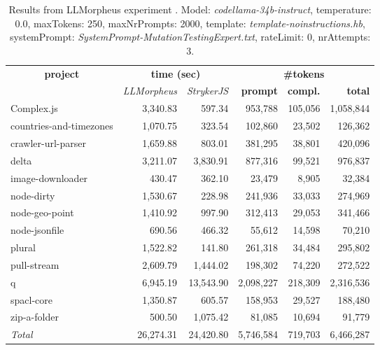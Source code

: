 
\begin{table*}[hbt!]
\centering
{\scriptsize
\begin{tabular}{l||r|r|r|r|r}
\multicolumn{1}{c|}{\bf project} & \multicolumn{2}{|c|}{\bf time (sec)} & \multicolumn{3}{|c|}{\bf \#tokens} \\
               & {\it LLMorpheus} & {\it StrykerJS} & {\bf prompt} & {\bf compl.} & {\bf total} \\
\hline
  Complex.js & 3,340.83 & 597.34 & 953,788 & 105,056 & 1,058,844 \\ 
countries-and-timezones & 1,070.75 & 323.54 & 102,860 & 23,502 & 126,362 \\ 
crawler-url-parser & 1,659.88 & 803.01 & 381,295 & 38,801 & 420,096 \\ 
delta & 3,211.07 & 3,830.91 & 877,316 & 99,521 & 976,837 \\ 
image-downloader & 430.47 & 362.10 & 23,479 & 8,905 & 32,384 \\ 
node-dirty & 1,530.67 & 228.98 & 241,936 & 33,033 & 274,969 \\ 
node-geo-point & 1,410.92 & 997.90 & 312,413 & 29,053 & 341,466 \\ 
node-jsonfile & 690.56 & 466.32 & 55,612 & 14,598 & 70,210 \\ 
plural & 1,522.82 & 141.80 & 261,318 & 34,484 & 295,802 \\ 
pull-stream & 2,609.79 & 1,444.02 & 198,302 & 74,220 & 272,522 \\ 
q & 6,945.19 & 13,543.90 & 2,098,227 & 218,309 & 2,316,536 \\ 
spacl-core & 1,350.87 & 605.57 & 158,953 & 29,527 & 188,480 \\ 
zip-a-folder & 500.50 & 1,075.42 & 81,085 & 10,694 & 91,779 \\ 
\hline
  \textit{Total} & 26,274.31 & 24,420.80 & 5,746,584 & 719,703 & 6,466,287 \\
  \end{tabular}
  }
  \\[2mm]
  \caption{Results from LLMorpheus experiment .
    Model: \textit{codellama-34b-instruct}, 
    temperature: 0.0, 
    maxTokens: 250, 
    maxNrPrompts: 2000, 
    template: \textit{template-noinstructions.hb}, 
    systemPrompt: \textit{SystemPrompt-MutationTestingExpert.txt}, 
    rateLimit: 0, 
    nrAttempts: 3.  
  }
  \label{table:Cost:run380:codellama-34b-instruct:template-noinstructions.hb:0.0}
\end{table*}
